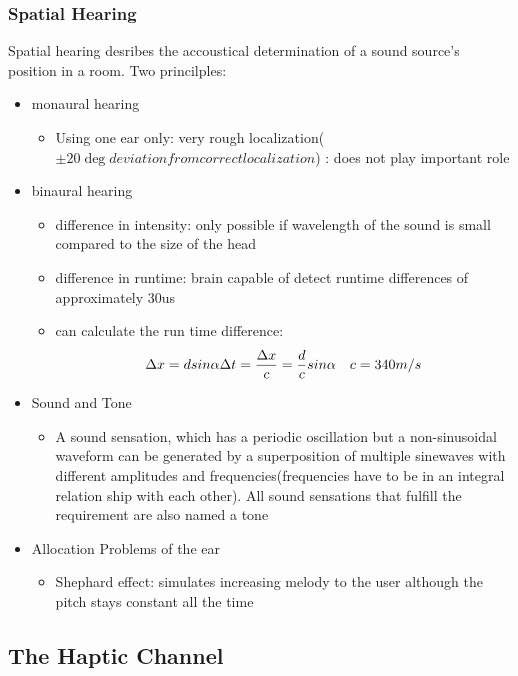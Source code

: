 \documentclass{standalone}
\begin{document}
\subsubsection{Spatial Hearing}
Spatial hearing desribes the accoustical determination of a sound source's position in a room. Two princilples:
\begin{itemize}
	\item monaural hearing
	\begin{itemize}
		\item Using one ear only: very rough localization($\pm 20 \deg deviation from correct localization$) : does not play important role
	\end{itemize}
	\item binaural hearing
	\begin{itemize}
		\item difference in intensity: only possible if wavelength of the sound is small compared to the size of the head
		\item difference in runtime: brain capable of detect runtime differences of approximately 30us
		\item can calculate the run time difference:
		$$
		\Delta x = d sin \alpha \\
		\Delta t = \frac{\Delta x}{c} = \frac{d}{c} sin \alpha \quad c = 340m/s
		$$
	\end{itemize}
	\item Sound and Tone
		\begin{itemize}
			\item A sound sensation, which has a periodic oscillation but a non-sinusoidal waveform can be generated by a superposition of multiple sinewaves with different amplitudes and frequencies(frequencies have to be in an integral relation ship with each other). All sound sensations that fulfill the requirement are also named a tone
		\end{itemize}
	\item Allocation Problems of the ear
			\begin{itemize}
			\item Shephard effect: simulates increasing melody to the user although the pitch stays constant all the time
		\end{itemize}
\end{itemize}

\subsection{The Haptic Channel}
\end{document}

